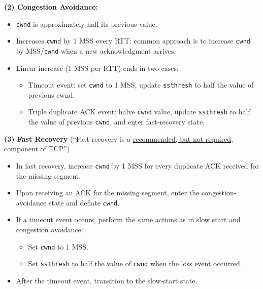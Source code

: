 \vspace{0.5em}
\noindent \textbf{(2) Congestion Avoidance:}
\begin{itemize}[noitemsep, nolistsep]
    \item \texttt{cwnd} is approximately half its previous value.
    \item Increases \texttt{cwnd} by 1 MSS every RTT: common approach is to increase \texttt{cwnd} by MSS/\texttt{cwnd} when a new acknowledgment arrives.
    \item Linear increase (1 MSS per RTT) ends in two cases:
    \begin{itemize}
        \item Timeout event: set \texttt{cwnd} to 1 MSS, update \texttt{ssthresh} to half the value of previous cwnd.
        \item Triple duplicate ACK event: halve \texttt{cwnd} value, update \texttt{ssthresh} to half the value of previous \texttt{cwnd}, and enter fast-recovery state.
    \end{itemize}
\end{itemize}

\vspace{0.25em}
\noindent \textbf{(3) Fast Recovery} {\footnotesize (``Fast recovery is a \underline{recommended, but not required}, component of TCP''\cite{Kurose2017})}
\begin{itemize}[noitemsep, nolistsep]
    \item In fast recovery, increase \texttt{cwnd} by 1 MSS for every duplicate ACK received for the missing segment.
    \item Upon receiving an ACK for the missing segment, enter the congestion-avoidance state and deflate \texttt{cwnd}.
    \item If a timeout event occurs, perform the same actions as in slow start and congestion avoidance:
    \begin{itemize}
        \item Set \texttt{cwnd} to 1 MSS.
        \item Set \texttt{ssthresh} to half the value of \texttt{cwnd} when the loss event occurred.
    \end{itemize}
    \item After the timeout event, transition to the slow-start state.
\end{itemize}

